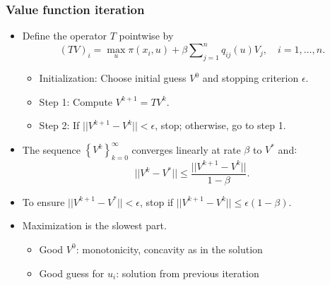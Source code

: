 \documentclass[bigger,handout]{beamer}
\newenvironment{stepitemize}{\begin{itemize}[<+->]}{\end{itemize} }
\begin{document}
\begin{frame}%

\frametitle{Value function iteration}

\begin{stepitemize}
\item Define the operator $T$ pointwise by
\begin{equation*}
(TV)_{i}=\max_{u}\pi (x_{i},u)+\beta
\sum\nolimits_{j=1}^{n}q_{ij}(u)V_{j},\quad i=1,\ldots ,n.
\end{equation*}

\begin{stepitemize}
\item Initialization: Choose initial guess $V^{0}$ and stopping criterion $%
\epsilon $.

\item Step 1: Compute $V^{k+1}=TV^{k}$.

\item Step 2: If $||V^{k+1}-V^{k}||<\epsilon $, stop; otherwise, go to step
1.
\end{stepitemize}

\item The sequence $\left\{ V^{k}\right\} _{k=0}^{\infty }$ converges
linearly at rate $\beta $ to $V^{\ast }$ and$:$%
\begin{equation*}
||V^{k}-V^{\ast }||\leq \frac{||V^{k+1}-V^{k}||}{1-\beta }.
\end{equation*}

\item To ensure $||V^{k+1}-V^{\ast }||<\epsilon $, stop if $%
||V^{k+1}-V^{k}||\leq \epsilon (1-\beta )$.

\item Maximization is the slowest part.

\begin{itemize}
\item Good $V^{0}$: monotonicity, concavity as in the solution

\item Good guess for $u_{i}$: solution from previous iteration
\end{itemize}
\end{stepitemize}



\end{frame}%
\end{document}
